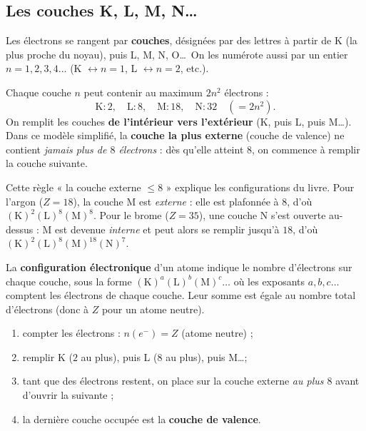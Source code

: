 \documentclass[11pt,a4paper]{article}
\newcommand{\ee}{e^{-}}      %
\renewcommand{\ne}{n(\ee)}   %
\begin{document}
\subsection{Les couches K, L, M, N\dots}

\begin{definition}
Les électrons se rangent par \textbf{couches}, désignées par des lettres à partir de K (la plus proche
du noyau), puis L, M, N, O\dots\ On les numérote aussi par un entier $n = 1, 2, 3, 4\dots$
(K $\leftrightarrow n=1$, L $\leftrightarrow n=2$, etc.).
\end{definition}

\begin{theoreme}
Chaque couche $n$ peut contenir au maximum $2n^2$ électrons :
\[ \text{K} : 2,\quad \text{L} : 8,\quad \text{M} : 18,\quad \text{N} : 32 \quad(=2n^2). \]
On remplit les couches \textbf{de l'intérieur vers l'extérieur} (K, puis L, puis M\dots). Dans ce
modèle simplifié, la \textbf{couche la plus externe} (couche de valence) ne contient \emph{jamais plus
de $8$ électrons} : dès qu'elle atteint $8$, on commence à remplir la couche suivante.
\end{theoreme}

\begin{remarque}
Cette règle « la couche externe $\le 8$ » explique les configurations du livre. Pour l'argon ($Z=18$),
la couche M est \emph{externe} : elle est plafonnée à $8$, d'où $(\mathrm{K})^2(\mathrm{L})^8(\mathrm{M})^8$.
Pour le brome ($Z=35$), une couche N s'est ouverte au-dessus : M est devenue \emph{interne} et peut
alors se remplir jusqu'à $18$, d'où $(\mathrm{K})^2(\mathrm{L})^8(\mathrm{M})^{18}(\mathrm{N})^7$.
\end{remarque}

\begin{definition}
La \textbf{configuration électronique} d'un atome indique le nombre d'électrons sur chaque couche, sous
la forme $(\mathrm{K})^a(\mathrm{L})^b(\mathrm{M})^c\dots$ où les exposants $a, b, c\dots$ comptent les
électrons de chaque couche. Leur somme est égale au nombre total d'électrons (donc à $Z$ pour un atome
neutre).
\end{definition}

\begin{methode}
\begin{enumerate}[leftmargin=1.7em,topsep=2pt,itemsep=1pt]
  \item compter les électrons : $\ne = Z$ (atome neutre) ;
  \item remplir K ($2$ au plus), puis L ($8$ au plus), puis M\dots ;
  \item tant que des électrons restent, on place sur la couche externe \emph{au plus $8$} avant
        d'ouvrir la suivante ;
  \item la dernière couche occupée est la \textbf{couche de valence}.
\end{enumerate}
\end{methode}
\end{document}
